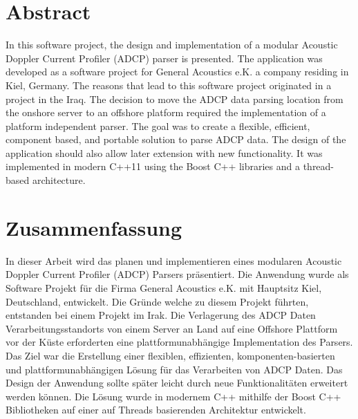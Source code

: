 \chapter*{Abstract}
In this software project, the design and implementation of a modular Acoustic Doppler Current Profiler (ADCP) parser is presented. The application was developed as a software project for General Acoustics e.K. a company residing in Kiel, Germany. The reasons that lead to this software project originated in a project in the Iraq. The decision to move the ADCP data parsing location from the onshore server to an offshore platform required the implementation of a platform independent parser. The goal was to create a flexible, efficient, component based, and portable solution to parse ADCP data. The design of the application should also allow later extension with new functionality. It was implemented in modern C++11 using the Boost C++ libraries and a thread-based architecture.
\chapter*{Zusammenfassung}
In dieser Arbeit wird das planen und implementieren eines modularen Acoustic Doppler Current Profiler (ADCP) Parsers präsentiert. Die Anwendung wurde als Software Projekt für die Firma General Acoustics e.K. mit Hauptsitz Kiel, Deutschland, entwickelt. Die Gründe welche zu diesem Projekt führten, entstanden bei einem Projekt im Irak. Die Verlagerung des ADCP Daten Verarbeitungsstandorts von einem Server an Land auf eine Offshore Plattform vor der Küste erforderten eine plattformunabhängige Implementation des Parsers. Das Ziel war die Erstellung einer flexiblen, effizienten, komponenten-basierten und plattformunabhängigen Lösung für das Verarbeiten von ADCP Daten. Das Design der Anwendung sollte später leicht durch neue Funktionalitäten erweitert werden können. Die Lösung wurde in modernem C++ mithilfe der Boost C++ Bibliotheken auf einer auf Threads basierenden Architektur entwickelt.


